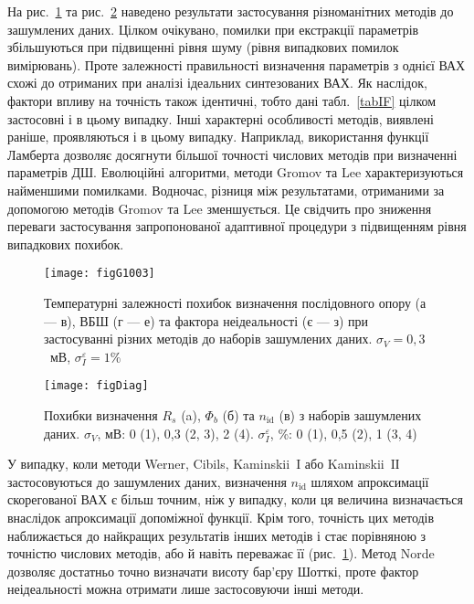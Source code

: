 На рис.~\ref{figG1003} та рис.~\ref{figDiag} наведено результати застосування різноманітних методів до зашумлених даних.
Цілком очікувано, помилки при екстракції параметрів збільшуються при підвищенні рівня шуму (рівня випадкових помилок вимірювань).
Проте залежності правильності визначення параметрів з однієї ВАХ схожі до отриманих при аналізі ідеальних синтезованих ВАХ.
Як наслідок, фактори впливу на точність також ідентичні, тобто дані табл.~\ref{tabIF} цілком застосовні і в цьому випадку.
Інші характерні особливості методів, виявлені раніше, проявляються і в цьому випадку.
Наприклад, використання функції Ламберта дозволяє досягнути більшої точності числових методів при визначенні параметрів ДШ.
Еволюційні алгоритми, методи Gromov та Lee характеризуються найменшими помилками.
Водночас, різниця між результатами, отриманими за допомогою методів Gromov та Lee зменшується.
Це свідчить про зниження переваги застосування запропонованої адаптивної процедури з підвищенням рівня випадкових похибок.



\begin{figure}
\center
\texttt{[image: figG1003]}%
\caption{\label{figG1003}
Температурні залежності похибок визначення послідовного опору (а --- в), ВБШ (г --- е) та фактора неідеальності (є --- з) при застосуванні різних методів до наборів зашумлених даних.
$\sigma_V=0,3$~мВ, $\sigma_I^\varepsilon=1\%$
}
\end{figure}

\begin{figure}
\center
\texttt{[image: figDiag]}%
\caption{\label{figDiag}
Похибки визначення $R_s$ (a), $\Phi_b$ (б) та $n_\mathrm{id}$ (в) з наборів зашумлених даних.
$\sigma_V$, мВ: 0 (1), 0,3 (2, 3), 2 (4).
$\sigma_I^\varepsilon$, \%: 0 (1), 0,5 (2), 1 (3, 4)
}
\end{figure}


У випадку, коли методи Werner, Cibils, Kaminskii~I або  Kaminskii~IІ застосовуються до зашумлених даних, визначення $n_\mathrm{id}$ шляхом апроксимації скорегованої ВАХ є більш точним, ніж у випадку, коли ця величина визначається внаслідок апроксимації допоміжної функції.
Крім того, точність цих методів наближається до найкращих результатів інших методів і стає порівняною з точністю числових методів, або й навіть переважає її (рис.~\ref{figG1003}).
Метод Norde дозволяє достатньо точно визначати висоту бар'єру Шотткі, проте фактор неідеальності можна отримати лише застосовуючи інші методи.

